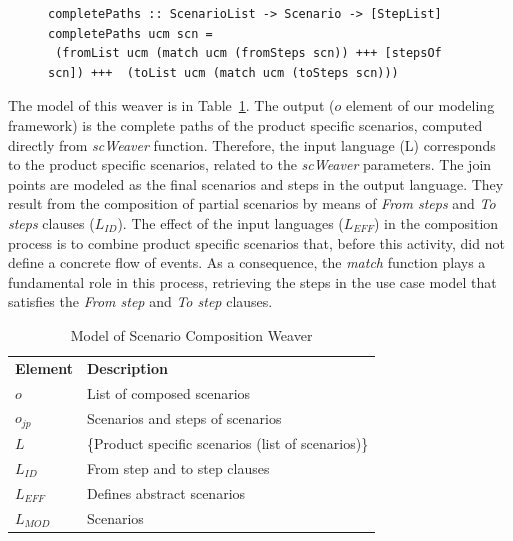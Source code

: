 \documentclass{report}
\begin{document}
\begin{frontmatter}
{\begin{figure}
\begin{lstlisting}[belowskip=10pt,frame=tb,caption={Scenario composition weaver function},label=lst:trace]
completePaths :: ScenarioList -> Scenario -> [StepList]
completePaths ucm scn =
 (fromList ucm (match ucm (fromSteps scn)) +++ [stepsOf scn]) +++  (toList ucm (match ucm (toSteps scn)))

\end{lstlisting}
\end{figure}

The model of this weaver is in Table~\ref{tab:sc-weaver}. The output ($o$ element of our modeling framework) is the complete paths of the product specific scenarios, computed directly from \emph{scWeaver} function. Therefore, the input language (L) corresponds to the product specific scenarios, related to the \emph{scWeaver} 
 parameters. 
The join points are modeled as the final scenarios and steps in the output language. They result from the composition of partial scenarios by means of 
\emph{From steps} and \emph{To steps} clauses ($L_{ID}$).  
The effect of the input languages ($L_{EFF}$) in the composition process is to combine 
product specific scenarios that, before this activity, did not define a concrete flow of events. As a consequence, the \emph{match} function 
plays a fundamental role in this process, retrieving the steps in the use case model that satisfies the \emph{From step} and \emph{To step} clauses.  

\begin{table}[hbt]
\begin{center}
\nocaptionrule \caption{Model of Scenario Composition Weaver}
\label{tab:sc-weaver}
\begin{tabular}{p{0.4in}p{2.6in}}
   \hline\noalign{\smallskip}
  {\bf Element} & {\bf Description} \\
   \noalign{\smallskip}
   \hline
   \noalign{\smallskip}
   $o$               & List of composed scenarios  \\ 
   $o_{jp}$        & Scenarios and steps of scenarios \\ 
   $L$               & \{Product specific scenarios (list of scenarios)\} \\ 
   $L_{ID}$       & From step and to step clauses \\ 
   $L_{EFF}$    & Defines abstract scenarios  \\ 
   $L_{MOD}$  &  Scenarios \\  
  \hline
  \end{tabular}
\end{center}
\end{table}

}
\end{frontmatter}
\end{document}
